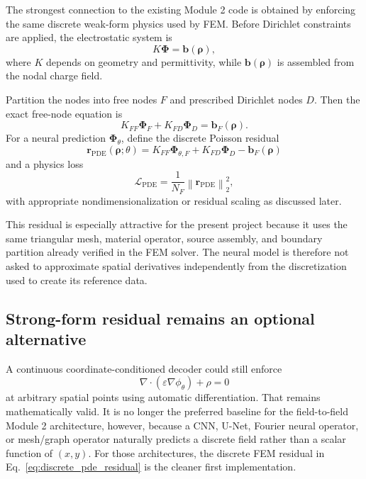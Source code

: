 \documentclass[11pt]{article}
\newcommand{\Lpde}{\mathcal{L}_{\mathrm{PDE}}}
\begin{document}
The strongest connection to the existing Module 2 code is obtained by enforcing the same discrete weak-form physics used by FEM. Before Dirichlet constraints are applied, the electrostatic system is
\begin{equation}
K\bm{\Phi}=\bm{b}(\bm{\rho}),
\end{equation}
where $K$ depends on geometry and permittivity, while $\bm{b}(\bm{\rho})$ is assembled from the nodal charge field.

Partition the nodes into free nodes $F$ and prescribed Dirichlet nodes $D$. Then the exact free-node equation is
\begin{equation}
K_{FF}\bm{\Phi}_F+K_{FD}\bm{\Phi}_D=\bm{b}_F(\bm{\rho}).
\end{equation}
For a neural prediction $\bm{\Phi}_{\theta}$, define the discrete Poisson residual
\begin{equation}
\boxed{
\bm{r}_{\mathrm{PDE}}(\bm{\rho};\theta)
=K_{FF}\bm{\Phi}_{\theta,F}
+K_{FD}\bm{\Phi}_{D}
-\bm{b}_F(\bm{\rho})
}
\label{eq:discrete_pde_residual}
\end{equation}
and a physics loss
\begin{equation}
\Lpde=\frac{1}{N_F}\left\|\bm{r}_{\mathrm{PDE}}\right\|_2^2,
\label{eq:discrete_pde_loss}
\end{equation}
with appropriate nondimensionalization or residual scaling as discussed later.

This residual is especially attractive for the present project because it uses the same triangular mesh, material operator, source assembly, and boundary partition already verified in the FEM solver. The neural model is therefore not asked to approximate spatial derivatives independently from the discretization used to create its reference data.

\subsection{Strong-form residual remains an optional alternative}

A continuous coordinate-conditioned decoder could still enforce
\begin{equation}
\nabla\cdot\left(\varepsilon\nabla\phi_{\theta}\right)+\rho=0
\end{equation}
at arbitrary spatial points using automatic differentiation. That remains mathematically valid. It is no longer the preferred baseline for the field-to-field Module 2 architecture, however, because a CNN, U-Net, Fourier neural operator, or mesh/graph operator naturally predicts a discrete field rather than a scalar function of $(x,y)$. For those architectures, the discrete FEM residual in Eq.~\eqref{eq:discrete_pde_residual} is the cleaner first implementation.
\end{document}
